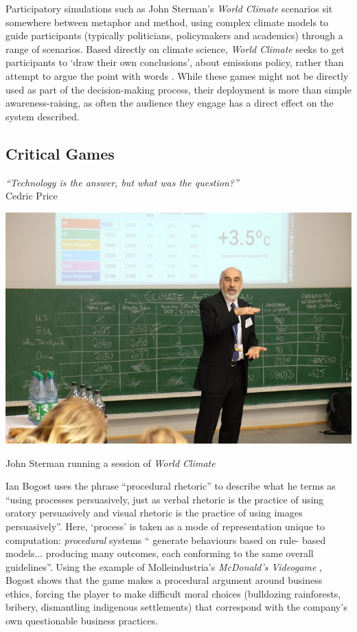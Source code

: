 \documentclass[nofonts,nols,justified,nobib]{tufte-book}
\begin{document}
Participatory simulations such as John Sterman's \emph{World Climate} scenarios sit somewhere between metaphor and method, using complex climate models to guide participants (typically politicians, policymakers and academics) through a range of scenarios. Based directly on climate science, \emph{World Climate} seeks to get participants to `draw their own conclusions', about emissions policy, rather than attempt to argue the point with words \cite{sterman_john_2013}. While these games might not be directly used as part of the decision-making process, their deployment is more than simple awareness-raising, as often the audience they engage has a direct effect on the system described.

\subsection*{Critical Games}

\begin{flushright}
\emph{``Technology is the answer, but what was the question?''} \cite{price_technology_1979}\\
Cedric Price
\end{flushright}

\begin{marginfigure}
\includegraphics[width=\textwidth]{img/1/sterman-climate.jpg}
\caption{John Sterman running a session of \emph{World Climate} \cite{sterman_john_2013}}
\end{marginfigure}

Ian Bogost uses the phrase ``procedural rhetoric'' to describe what he terms as ``using processes persuasively,  just as verbal rhetoric is the practice of using oratory persuasively and visual rhetoric is the practice of using images persuasively''. Here, `process' is taken as a mode of representation unique to computation: \emph{procedural} systems `` generate behaviours based on rule- based models... producing many outcomes, each conforming to the same overall guidelines''. Using the example of Molleindustria's \emph{McDonald's Videogame} \cite{molleindustria_mcdonalds_2006}, Bogost shows that the game makes a procedural argument around business ethics, forcing the player to make difficult moral choices (bulldozing rainforests, bribery, dismantling indigenous settlements) that correspond with the company's own questionable business practices. \cite{bogost_rhetoric_2008}
\end{document}
